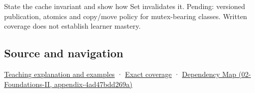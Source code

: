 State the cache invariant and show how Set invalidates it. Pending: versioned publication, atomics and copy/move policy for mutex-bearing classes. Written coverage does not establish learner mastery.

\subsection{Source and navigation}\label{source-and-navigation}

\href{Continuous\%20Notes/Computing\%20Foundations\%20-\%20From\%20Bits\%20to\%20C++\%20and\%20Systems\%20APIs\#A\%20cache\%20may\%20change\%20bits\%20without\%20changing\%20meaning}{Teaching explanation and examples} · \hyperref[appendix-fd090d982a15]{Exact coverage} · \href{}{Dependency Map (02-Foundations-II, appendix-4ad47bdd269a)}
